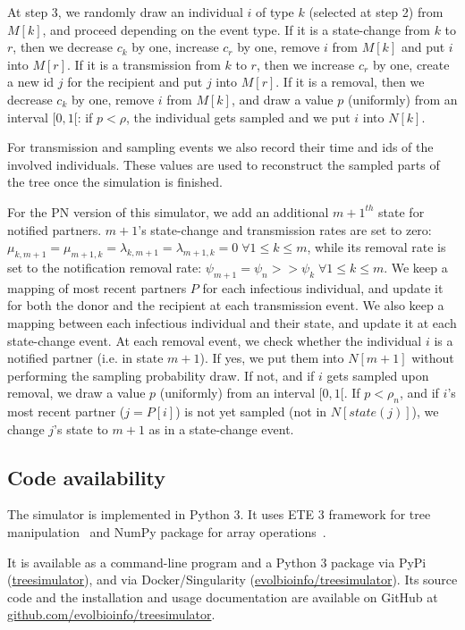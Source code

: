 \documentclass[a4paper,10pt]{article}
\begin{document}
At step 3, we randomly draw an individual $i$ of type $k$ (selected at step 2) from $M[k]$, and proceed depending on the event type. If it is a state-change from $k$ to $r$, then we decrease $c_k$ by one, increase $c_r$ by one, remove $i$ from $M[k]$ and put $i$ into $M[r]$. If it is a transmission from $k$ to $r$, then we increase $c_r$ by one, create a new id $j$ for the recipient and put $j$ into $M[r]$. If it is a removal, then we decrease $c_k$ by one, remove $i$ from $M[k]$, and draw a value $p$ (uniformly) from an interval $[0, 1[$: if $p < \rho$, the individual gets sampled and we put $i$ into $N[k]$. 

For transmission and sampling events we also record their time and ids of the involved individuals. These values are used to reconstruct the sampled parts of the tree once the simulation is finished.


For the PN version of this simulator, we add an additional $m+1^{th}$ state for notified partners. $m + 1$'s state-change and transmission rates are set to zero: $\mu_{k,m+1} = \mu_{m+1,k} = \lambda_{k,m+1} = \lambda_{m+1,k} = 0\; \forall 1 \leq k \leq m$, while its removal rate is set to the notification removal rate: $\psi_{m+1} = \psi_n >> \psi_k\; \forall 1 \leq k \leq m$. We keep a mapping of most recent partners $P$ for each infectious individual, and update it for both the donor and the recipient at each transmission event. We also keep a mapping between each infectious individual and their state, and update it at each state-change event. At each removal event, we check whether the individual $i$ is a notified partner (i.e. in state $m+1$). If yes, we put them into $N[m+1]$ without performing the sampling probability draw. If not, and if $i$ gets sampled upon removal, we draw a value $p$ (uniformly) from an interval $[0, 1[$. If $p < \rho_n$, and if $i$'s most recent partner ($j = P[i]$) is not yet sampled (not in $N[state(j)]$), we change $j$'s state to $m + 1$ as in a state-change event.


\subsection*{Code availability}
The simulator is implemented in Python 3. It uses ETE 3 framework for tree manipulation~\cite{Huerta-Cepas2016} and NumPy package for array operations~\cite{harris_array_2020}. 

It is available as a command-line program and a Python 3 package via PyPi (\href{https://pypi.org/project/treesimulator}{treesimulator}), and via Docker/Singularity (\href{https://hub.docker.com/r/evolbioinfo/treesimulator/tags}{evolbioinfo/treesimulator}). Its source code and the installation and usage documentation are available on GitHub at \href{https://github.com/evolbioinfo/treesimulator}{github.com/evolbioinfo/treesimulator}.
\end{document}
